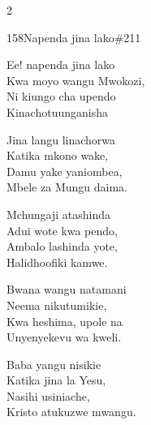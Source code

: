 \begin{multicols}{2}
\begin{hymn}{158}{Napenda jina lako}{\#211}
\begin{stanza}
Ee! napenda jina lako\\
Kwa moyo wangu Mwokozi,\\
Ni kiungo cha upendo\\
Kinachotuunganisha
\end{stanza}
\begin{chorus}
Jina langu linachorwa\\
Katika mkono wake,\\
Damu yake yaniombea,\\
Mbele za Mungu daima.
\end{chorus}
\begin{stanza}
Mchungaji atashinda\\
Adui wote kwa pendo,\\
Ambalo lashinda yote,\\
Halidhoofiki kamwe.
\end{stanza}
\begin{stanza}
Bwana wangu natamani\\
Neema nikutumikie,\\
Kwa heshima, upole na\\
Unyenyekevu wa kweli.
\end{stanza}
\begin{stanza}
Baba yangu nisikie\\
Katika jina la Yesu,\\
Nasihi usiniache,\\
Kristo atukuzwe mwangu.
\end{stanza}
\end{hymn}


\end{multicols}
